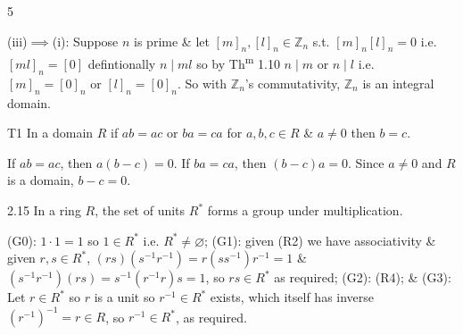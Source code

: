 \documentclass[8pt]{extarticle}
\makeatletter
\renewenvironment{proof}[1][\proofname]{%
  \par%
  \pushQED{\qed}%
  \normalfont
  \topsep=2pt\partopsep=0pt\parsep=0pt\itemsep=0pt%
  \trivlist
  \item[\hskip\labelsep\itshape #1\@addpunct{.}]\ignorespaces
}{%
  \popQED\endtrivlist\@endpefalse
  \vspace{-1pt}%
}
\makeatother
\begin{document}
\begin{multicols}{5}
\begin{proof}
            (iii)\(\implies\)(i):
            Suppose \(n\) is prime \& let \([m]_n,[l]_n\in\mathbb{Z}_n\) s.t. \([m]_n[l]_n=0\) i.e. \([ml]_n=[0]\) defintionally \(n\mid ml\) so by Th\textsuperscript{m} 1.10 \(n\mid m\) or \(n\mid l\) i.e. \([m]_n=[0]_n\) or \([l]_n=[0]_n\). So with \(\mathbb{Z}_n\)'s commutativity, \(\mathbb{Z}_n\) is an integral domain.
        \end{proof}

        \begin{proposition}{T1}
            In a domain \(R\) if \(ab=ac\) or \(ba=ca\) for \(a,b,c\in R\) \& \(a\ne0\) then \(b=c\).
        \end{proposition}

        \begin{proof}
            If \(ab=ac\), then \(a(b-c)=0\). If \(ba=ca\), then \((b-c)a=0\). Since \(a\ne0\) and \(R\) is a domain, \(b-c=0\).        
        \end{proof}

        \begin{lemma}{2.15}
            In a ring \(R\), the set of units \(R^*\) forms a group under multiplication.
        \end{lemma}

        \begin{proof}
            (G0): \(1\cdot1=1\) so \(1\in R^*\) i.e. \(R^*\ne\varnothing\); (G1): given (R2) we have associativity \& given \(r,s\in R^*\), \((rs)(s^{-1}r^{-1})=r(ss^{-1})r^{-1}=1\) \&
            \((s^{-1}r^{-1})(rs)=s^{-1}(r^{-1}r)s=1\), so \(rs\in R^*\) as required; (G2): (R4); \& (G3): Let \(r\in R^*\) so \(r\) is a unit so \(r^{-1}\in R^*\) exists, which itself has inverse \((r^{-1})^{-1}=r\in R\), so \(r^{-1}\in R^*\), as required.

        \end{proof}

        \vspace{-2pt}
        \noindent{}
\end{multicols}
\end{document}
